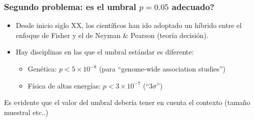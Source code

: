 \documentclass[9pt]{beamer}
\begin{document}
  \begin{frame}
    \frametitle{Segundo problema: es el umbral $p = 0.05$ adecuado?}
    \begin{overlayarea}{\textwidth}{0.8\textheight}
    \begin{itemize}
    \item Desde inicio siglo XX, los científicos han ido adoptado un híbrido entre el enfoque de Fisher y
      el de Neyman \& Pearson (teoría
      decisión).\\ \medskip
    \item<3-> Hay disciplinas en las que el umbral estándar es diferente:
      \begin{itemize}
      \item Genética: $p < 5\times 10^{-8}$ (para ``genome-wide
        association studies'')
      \item Física de altas energías: $ p < 3 \times 10^{-7}$ (``$3\sigma$'')
      \end{itemize}
    \end{itemize}
    Es evidente que el valor del umbral debería tener en cuenta el
    contexto (tamaño muestral etc..)
  \end{overlayarea}
\end{frame}
\end{document}
